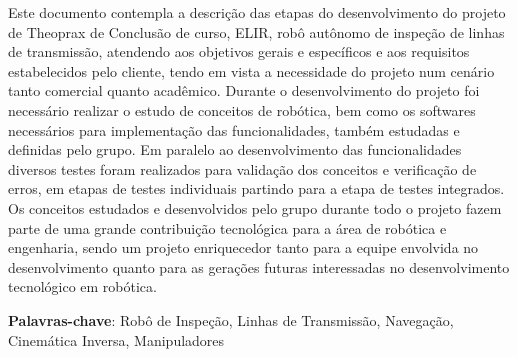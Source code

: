 \begin{thesisresumo}
Este documento contempla a descrição das etapas do desenvolvimento do projeto de Theoprax de Conclusão de curso, ELIR, robô autônomo de inspeção de linhas de transmissão, atendendo aos objetivos gerais e específicos e aos requisitos estabelecidos pelo cliente, tendo em vista a necessidade do projeto num cenário tanto comercial quanto acadêmico. Durante o desenvolvimento do projeto foi necessário realizar o estudo de conceitos de robótica, bem como os softwares necessários para implementação das funcionalidades, também estudadas e definidas pelo grupo. Em paralelo ao desenvolvimento das funcionalidades diversos testes foram realizados para validação dos conceitos e verificação de erros, em etapas de testes individuais partindo para a etapa de testes integrados. Os conceitos estudados e desenvolvidos pelo grupo durante todo o projeto fazem parte de uma grande contribuição tecnológica para a área de robótica e engenharia, sendo um projeto enriquecedor tanto para a equipe envolvida no desenvolvimento quanto para as gerações futuras interessadas no desenvolvimento tecnológico em robótica.   





\textbf{Palavras-chave}: Robô de Inspeção, Linhas de Transmissão, Navegação, Cinemática Inversa, Manipuladores

\end{thesisresumo}
